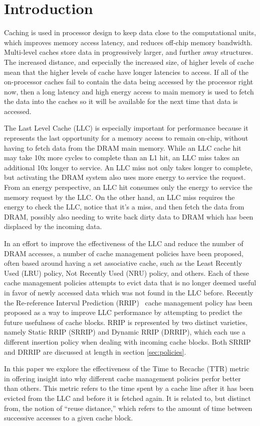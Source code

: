 \section{Introduction}

Caching is used in processor design to keep data close to the
computational units, which improves memory access latency, and reduces off-chip memory bandwidth.  Multi-level
caches store data in progressively larger,
and further away structures.  The increased distance, and especially
the increased size, of higher levels of cache mean that the higher
levels of cache have longer latencies to access.  If all of the
on-processor caches fail to contain the data being accessed by the
processor right now, then a long latency and high energy access to
main memory is used to fetch the data into the caches so it will be
available for the next time that data is accessed.

The Last Level Cache (LLC) is especially important for performance
because it represents the last opportunity for a memory access to
remain on-chip, without having to fetch data from the DRAM main
memory.  While an LLC cache hit may take 10x more cycles to complete
than an L1 hit, an LLC miss takes an additional 10x longer to
service.  An LLC miss not only takes longer to complete, but
activating the
DRAM system also uses more energy to service the request.  From an
energy perspective, an LLC hit consumes only the energy to service the
memory request by the LLC.  On the other hand, an LLC miss requires
the energy to
check the LLC, notice that it's a miss, and then fetch the data from
DRAM, possibly also needing to write back dirty data to DRAM which has been
displaced by the incoming data. 

In an effort to improve the effectiveness of the LLC and reduce the
number of DRAM accesses, a number of cache management policies have
been proposed, often based around having a set associative cache, such
as the Least Recently Used (LRU) policy, Not Recently Used
(NRU) policy, and others.  Each of these cache management policies
attempts to
evict data that is no longer deemed useful in favor of newly accessed
data which was not found in the LLC before.  Recently the
Re-reference Interval Prediction (RRIP)~\cite{jaleeltheobald10} cache
management policy has
been proposed as a way to improve LLC performance by attempting to
predict the future usefulness of cache blocks.  RRIP is represented by
two distinct varieties, namely Static RRIP (SRRIP) and Dynamic RRIP (DRRIP), which
each use a different insertion policy when dealing with incoming
cache blocks.  Both SRRIP and DRRIP are discussed at length in section
\ref{sec:policies}.

In this paper we explore the effectiveness of the Time to Recache
(TTR) metric in offering insight into why different cache management
policies perfor better than others.  This metric refers
to the time spent by a cache line after it has been evicted from the
LLC and before it is fetched again.  It is related to, but distinct
from, the notion of ``reuse distance,'' which refers to the amount of
time between successive accesses to a given cache block.

